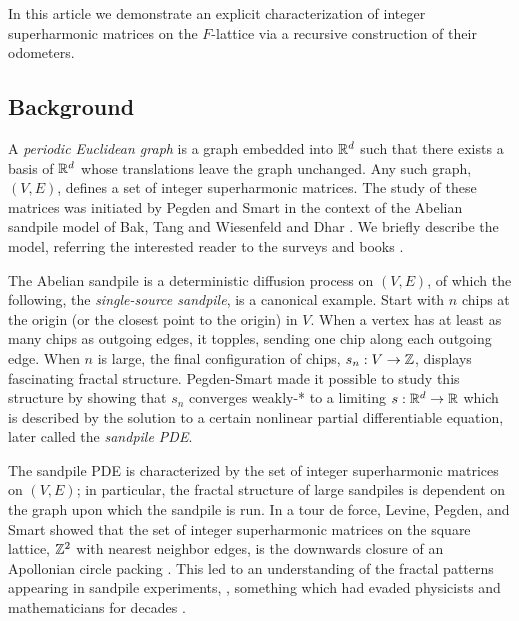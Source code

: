 \documentclass[12pt]{amsart}
\begin{document}
		

	
	In this article we demonstrate an explicit characterization of integer superharmonic matrices on the $F$-lattice
	via a recursive construction of their odometers.


	\subsection{Background}
		A {\it periodic Euclidean graph} is a graph embedded into $\mathbb{R}^d$ such that there exists a basis of $\mathbb{R}^d$
		whose translations leave the graph unchanged.  Any such graph, $(V, E)$, defines a set of integer superharmonic matrices.   
	The study of these matrices was initiated by Pegden and Smart \cite{pegden2013convergence} in the context of the Abelian sandpile model of Bak, Tang and Wiesenfeld and Dhar  \cite{bak1987self, dhar1990self}.
	We briefly describe the model, 	referring the interested reader to the surveys \cite{redig2005mathematical, holroyd2008chip, jarai2018sandpile} and books
	\cite{klivans2018mathematics, corry2018divisors}.
	
	 The Abelian sandpile is a deterministic diffusion process on $(V,E)$, of which the following, the {\it single-source sandpile}, is a canonical example. Start with $n$ chips at the origin (or the closest point to the origin) in $V$. When a vertex has at least as many chips as outgoing edges, it topples, sending one chip along each outgoing edge.  When $n$ is large, the final configuration of chips, $s_n: V \to \mathbb{Z}$, displays fascinating fractal structure.  Pegden-Smart made it possible to study this structure by showing that $s_n$ converges weakly-* to a limiting $s:\mathbb{R}^d \to \mathbb{R}$ which is described by the solution to a certain nonlinear partial differentiable equation, later called the {\it sandpile PDE}. 
	
	The sandpile PDE is characterized by the set of integer superharmonic matrices on $(V,E)$; in particular, the fractal structure of 
	large sandpiles is dependent on the graph upon which the sandpile is run.  In a tour de force, Levine, Pegden, and Smart showed that the set of integer superharmonic matrices on the square lattice, $\mathbb{Z}^2$ with nearest neighbor edges, is the downwards closure of an Apollonian circle packing \cite{levine2017apollonian}. This led to an understanding of the fractal patterns appearing in sandpile experiments, \cite{levine2016apollonian, pegden2020stability}, something which had evaded physicists and mathematicians for decades \cite{liu1990geometry,le2002identity, ostojic2003patterns}.
	
\end{document}
